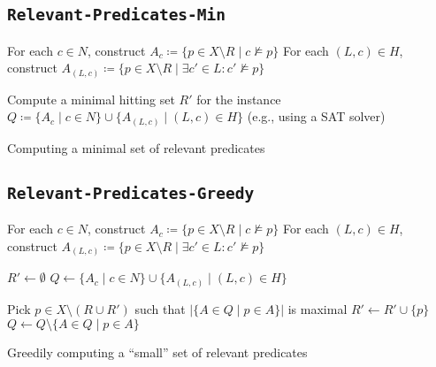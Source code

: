 \subsection{\texttt{Relevant-Predicates-Min}}
\label{app:relevant-predicates-min}

\begin{algorithm}[H]

    {

        For each $c \in N$, construct $A_c \coloneqq \{ p \in X \setminus R \mid c \not\models p \}$\;
        For each $(L, c) \in H$, construct $A_{(L, c)} \coloneqq \{ p \in X \setminus R \mid \exists c' \in L \colon c' \not\models p \}$\;    

        \BlankLine
        
        Compute a minimal hitting set $R'$ for the instance $Q \coloneqq \{ A_c \mid c \in N \} \cup \{ A_{(L, c)} \mid (L, c) \in H \}$ (e.g., using a SAT solver)\;
        
        \BlankLine

        \;
    }
    
    \caption{Computing a minimal set of relevant predicates}
    \label{alg:relevant-predicates-min}
\end{algorithm}

\subsection{\texttt{Relevant-Predicates-Greedy}}
\label{app:relevant-predicates-greedy}

\begin{algorithm}[H]

    {

        For each $c \in N$, construct $A_c \coloneqq \{ p \in X \setminus R \mid c \not\models p \}$\;
        For each $(L, c) \in H$, construct $A_{(L, c)} \coloneqq \{ p \in X \setminus R \mid \exists c' \in L \colon c' \not\models p \}$\;  

        \BlankLine
        
        $R'\gets \emptyset$\;
        $Q \gets \{ A_c \mid c \in N \} \cup \{ A_{(L, c)} \mid (L, c) \in H \}$\;

        \BlankLine

        {
            Pick $p \in X \setminus (R \cup R')$ such that $|\{ A \in Q \mid p \in A \}|$ is maximal\;
            $R'\gets R' \cup \{ p \}$\;
            $Q \gets Q \setminus \{ A \in Q \mid p \in A \}$\;
        }

        \BlankLine

        \;
    }
    
    \caption{Greedily computing a ``small'' set of relevant predicates}
    \label{alg:relevant-predicates-greedy}
\end{algorithm}
